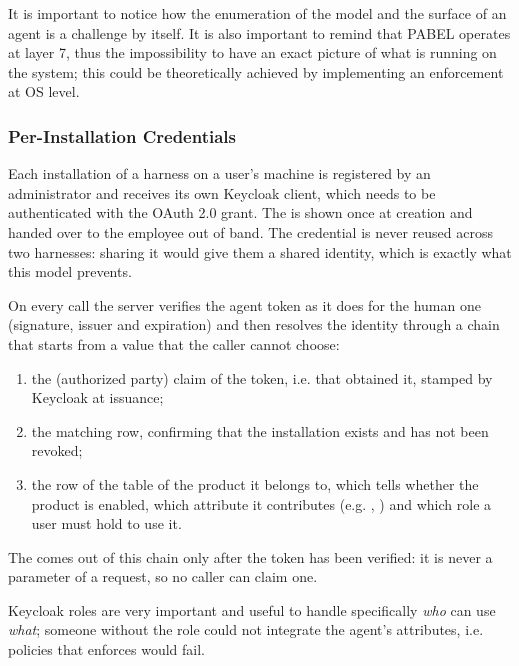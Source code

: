 It is important to notice how the enumeration of the model and the surface of an agent is a challenge by itself.
It is also important to remind that PABEL operates at layer 7, thus the impossibility to have an exact picture of what is running on the system; this could be theoretically achieved by implementing an enforcement at OS level.
\subsubsection{Per-Installation Credentials}
Each installation of a harness on a user's machine is registered by an administrator and receives its own Keycloak client, which needs to be authenticated with the OAuth 2.0  grant.
The  is shown once at creation and handed over to the employee out of band. The credential is never reused across two harnesses: sharing it would give them a shared identity, which is exactly what this model prevents.

On every call the server verifies the agent token as it does for the human one (signature, issuer and expiration) and then resolves the identity through a chain that starts from a value that the caller cannot choose:
\begin{enumerate}
  \item the  (authorized party) claim of the token, i.e.  that obtained it, stamped by Keycloak at issuance;
  \item the matching  row, confirming that the installation exists and has not been revoked;
  \item the row of the  table of the product it belongs to, which tells whether the product is enabled, which attribute it contributes (e.g. , ) and which role a user must hold to use it.
\end{enumerate}
The  comes out of this chain only after the token has been verified: it is never a parameter of a request, so no caller can claim one.

Keycloak roles are very important and useful to handle specifically \textit{who} can use \textit{what}; someone without the role  could not integrate the agent's attributes, i.e. policies that enforces  would fail.
